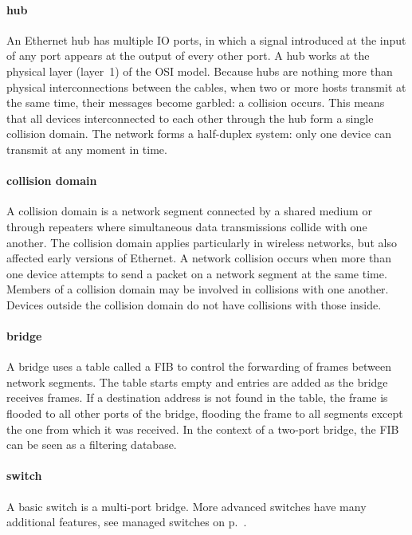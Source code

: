 \paragraph{hub}
An Ethernet hub has multiple \ac{IO} ports, in which a signal introduced at the input of any port appears at the output of every other port.
A hub works at the physical layer (layer~1) of the \ac{OSI} model.
Because hubs are nothing more than physical interconnections between the cables, when two or more hosts transmit at the same time, their messages become garbled: a collision occurs.
This means that all devices interconnected to each other through the hub form a single collision domain.
The network forms a half-duplex system: only one device can transmit at any moment in time.

\paragraph{collision domain}
A collision domain is a network segment connected by a shared medium or through repeaters where simultaneous data transmissions collide with one another.
The collision domain applies particularly in wireless networks, but also affected early versions of Ethernet.
A network collision occurs when more than one device attempts to send a packet on a network segment at the same time.
Members of a collision domain may be involved in collisions with one another.
Devices outside the collision domain do not have collisions with those inside.

\paragraph{bridge}
A bridge uses a table called a \acf{FIB} to control the forwarding of frames between network segments.
The table starts empty and entries are added as the bridge receives frames.
If a destination address is not found in the table, the frame is flooded to all other ports of the bridge, flooding the frame to all segments except the one from which it was received.
In the context of a two-port bridge, the \acl{FIB} can be seen as a filtering database.

\paragraph{switch}
A basic switch is a multi-port bridge.
More advanced switches have many additional features, see managed switches on p.~\pageref{par:ethernet-switch-managed}.

